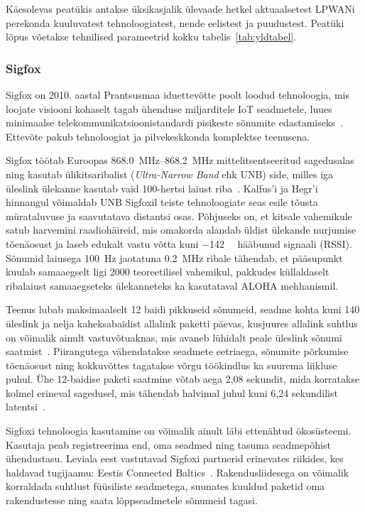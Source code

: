 \documentclass[12pt]{article}
\begin{document}
    Käesolevas peatükis antakse üksikasjalik ülevaade hetkel aktuaalsetest LPWANi perekonda kuuluvatest tehnoloogiatest, nende eelistest ja puudustest.
    Peatüki lõpus võetakse tehnilised parameetrid kokku tabelis~\ref{tab:yldtabel}.

    \subsubsection{Sigfox}

    Sigfox on 2010. aastal Prantsusmaa iduettevõtte poolt loodud tehnoloogia, mis loojate visiooni kohaselt tagab ühenduse miljarditele IoT seadmetele, luues minimaalse telekommunikatsioonistandardi pisikeste sõnumite edastamiseks~\cite{sigfox}.
    Ettevõte pakub tehnoloogiat ja pilvekeskkonda komplektse teenusena.

    Sigfox töötab Euroopas \SIrange{868.0}{868.2}{\mega\hertz} mittelitsentseeritud sagedusalas ning kasutab ülikitsaribalist (\textit{Ultra-Narrow Band} ehk UNB) side, milles iga üleslink ülekanne kasutab vaid 100-hertsi laiust riba~\cite{sigfoxtech}.
    Kalfus'i ja Hegr'i~\cite{kalfus2016ultra} hinnangul võimaldab UNB Sigfoxil teiste tehnoloogiate seas esile tõusta mürataluvuse ja saavutatava distantsi osas.
    Põhjuseks on, et kitsale vahemikule satub harvemini raadiohäireid, mis omakorda alandab üldist ülekande nurjumise tõenäosust ja laseb edukalt vastu võtta kuni \SI{-142}{\deci\belm} hääbunud signaali (RSSI).
    Sõnumid laiusega \SI{100}{\hertz} jaotatuna \SI{0,2}{\mega\hertz} ribale tähendab, et pääsupunkt kuulab samaaegselt ligi 2000 teoreetilisel vahemikul, pakkudes küllaldaselt ribalaiust samaaegseteks ülekanneteks ka kasutataval ALOHA mehhanismil.

    Teenus lubab maksimaalselt 12 baidi pikkuseid sõnumeid, seadme kohta kuni 140 üleslink ja nelja kaheksabaidist allalink paketti päevas, kusjuures allalink suhtlus on võimalik ainult vastuvõtuaknas, mis avaneb lühidalt peale üleslink sõnumi saatmist~\cite{sigfoxtech}.
    Piirangutega vähendatakse seadmete eetriaega, sõnumite põrkumise tõenäosust ning kokkuvõttes tagatakse võrgu töökindlus ka suurema liikluse puhul.
    Ühe 12-baidise paketi saatmine võtab aega 2,08 sekundit, mida korratakse kolmel erineval sagedusel, mis tähendab halvimal juhul kuni 6,24 sekundilist latentsi~\cite{sigfoxtech}.

    Sigfoxi tehnoloogia kasutamine on võimalik ainult läbi ettenähtud ökosüsteemi.
    Kasutaja peab registreerima end, oma seadmed ning tasuma seadmepõhist ühendustasu.
    Leviala eest vastutavad Sigfoxi partnerid erinevates riikides, kes haldavad tugijaamu: Eestis Connected Baltics~\cite{sfCoverage}.
    Rakendusliidesega on võimalik korraldada suhtlust füüsiliste seadmetega, suunates kuuldud paketid oma rakendustesse ning saata lõppseadmetele sõnumeid tagasi.
\end{document}
